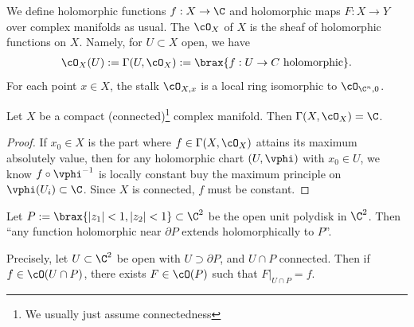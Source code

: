 \documentclass[11pt]{report}
\begin{document}
\begin{defn}
We define holomorphic functions $f:X \to \C$ and holomorphic maps $F : X \to Y$ over complex manifolds as usual. The  $\cO_X$ of $X$ is the sheaf of holomorphic functions on $X$. Namely, for $U \subset X$ open, we have
\begin{align*}
\cO_X(U):=\Gamma(U,\cO_X):= \brax{f:U \to C \text{ holomorphic}}.
\end{align*}
For each point $x \in X$, the stalk $\cO_{X,x}$ is a local ring isomorphic to $\cO_{\C^n,0}$.
\end{defn}

\begin{prop}
Let $X$ be a compact (connected)\footnote{We usually just assume connectedness} complex manifold. Then $\Gamma(X,\cO_X)=\C$.
\end{prop}

\begin{proof}
If $x_0 \in X$ is the part where $f \in \Gamma(X,\cO_X)$ attains its maximum absolutely value, then for any holomorphic chart $(U,\vphi)$ with $x_0 \in U$, we know $f \circ \vphi^{-1}$ is locally constant buy the maximum principle on $\vphi(U_i)\subset \C$. Since $X$ is connected, $f$ must be constant.
\end{proof}

\begin{thm}
Let $P:=\brax{|z_1|<1, |z_2|<1} \subset \C^2$ be the open unit polydisk in $\C^2$. Then ``any function holomorphic near $\partial P$ extends holomorphically to $P$''.

Precisely, let $U \subset \C^2$ be open with $U \supset \partial P$, and $U \cap P$ connected. Then if $f \in \cO(U \cap P)$, there exists $F \in \cO(P)$ such that $F|_{U \cap P}= f$.
\end{thm}
\end{document}
